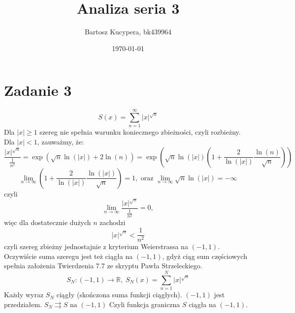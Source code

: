 \documentclass{article}
\title{Analiza seria 3}
\author{Bartosz Kucypera, bk439964}
\date{\today}
\begin{document}
\maketitle

\section*{Zadanie 3}
$$ \displaystyle S(x) =\sum_{n=1}^{\infty} |x|^{\sqrt{n}} $$
Dla $|x| \ge 1$ szereg nie spełnia warunku koniecznego zbieżności, czyli rozbieżny. \newline \newline
Dla $|x| < 1$, zauważmy, że:
$$\displaystyle \frac{|x|^{\sqrt{n}}}{\frac{1}{n^2}} = \exp(\sqrt{n}\ln(|x|) +2\ln(n)) = 
\exp\left(\sqrt{n}\ln(|x|) \left( 1 + \frac{2}{\ln(|x|)}\frac{\ln(n)}{\sqrt{n}} \right) \right) $$
$$ \displaystyle \lim_{n \to \infty} \left(1 + \frac{2}{\ln(|x|)} \frac{\ln(|x|)}{\sqrt{n}} \right) = 1, \mbox{ oraz } \lim_{n \to \infty} \sqrt{n}\ln(|x|) = -\infty $$
czyli 
$$ \lim_{n \to \infty} \frac{|x|^{\sqrt{n}}}{\frac{1}{n^2}} = 0, $$
więc dla dostatecznie dużych $n$ zachodzi $$|x|^{\sqrt{n}} < \frac{1}{n^2}$$
czyli szereg zbieżny jednostajnie z kryterium Weierstrassa na $(-1, 1)$. \newline
Oczywiście suma szeregu jest też ciągła na $(-1, 1)$, gdyż ciąg sum częściowych spełnia założenia Twierdzenia 7.7 ze skryptu Pawła Strzeleckiego. 
$$ S_N : (-1, 1) \to \mathbb{R}, \; S_N(x) = \sum_{n=1}^{N} |x|^{\sqrt{n}} $$
Każdy wyraz $S_N$ ciągły (skończona suma funkcji ciągłych). \newline
$(-1, 1)$ jest przedziałem. \newline
$S_N \rightrightarrows S \mbox{ na } (-1, 1)$ \newline
Czyli funkcja graniczna $S$ ciągła na $(-1, 1)$.
\end{document}
